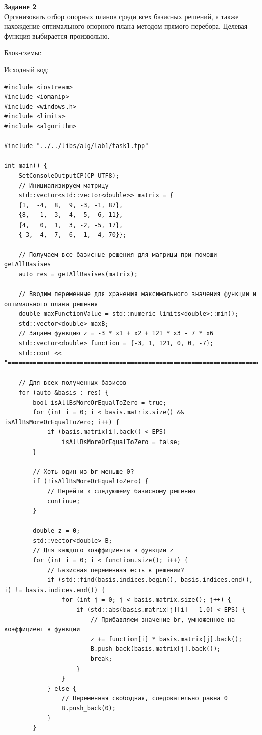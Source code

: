 \documentclass[a4paper,14pt]{extarticle}
\begin{document}
\textbf{Задание 2}\\
Организовать отбор опорных планов среди всех базисных решений, а также нахождение
оптимального опорного плана методом прямого перебора. Целевая функция выбирается
произвольно.\bigbreak

Блок-схемы:
\begin{center}
    
\end{center}
Исходный код:
\begin{verbatim}
#include <iostream>
#include <iomanip>
#include <windows.h>
#include <limits>
#include <algorithm>

#include "../../libs/alg/lab1/task1.tpp"

int main() {
    SetConsoleOutputCP(CP_UTF8);
    // Инициализируем матрицу
    std::vector<std::vector<double>> matrix = {
    {1,  -4,  8,  9, -3, -1, 87},
    {8,   1, -3,  4,  5,  6, 11},
    {4,   0,  1,  3, -2, -5, 17},
    {-3, -4,  7,  6, -1,  4, 70}};

    // Получаем все базисные решения для матрицы при помощи getAllBasises
    auto res = getAllBasises(matrix);

    // Вводим переменные для хранения максимального значения функции и оптимального плана решения 
    double maxFunctionValue = std::numeric_limits<double>::min();
    std::vector<double> maxB;
    // Задаём функцию z = -3 * x1 + x2 + 121 * x3 - 7 * x6
    std::vector<double> function = {-3, 1, 121, 0, 0, -7};
    std::cout << "==================================================================================================================\n";

    // Для всех полученных базисов
    for (auto &basis : res) {
        bool isAllBsMoreOrEqualToZero = true;
        for (int i = 0; i < basis.matrix.size() && isAllBsMoreOrEqualToZero; i++) {
            if (basis.matrix[i].back() < EPS) 
                isAllBsMoreOrEqualToZero = false;
        }

        // Хоть один из br меньше 0?
        if (!isAllBsMoreOrEqualToZero) { 
            // Перейти к следующему базисному решению
            continue;
        }

        double z = 0;
        std::vector<double> B;
        // Для каждого коэффициента в функции z
        for (int i = 0; i < function.size(); i++) {
            // Базисная переменная есть в решении?
            if (std::find(basis.indices.begin(), basis.indices.end(), i) != basis.indices.end()) {
                for (int j = 0; j < basis.matrix.size(); j++) {
                    if (std::abs(basis.matrix[j][i] - 1.0) < EPS) {
                        // Прибавляем значение br, умноженное на коэффициент в функции
                        z += function[i] * basis.matrix[j].back();
                        B.push_back(basis.matrix[j].back());
                        break;
                    }
                }
            } else {
                // Переменная свободная, следовательно равна 0
                B.push_back(0);
            }
        }


\end{verbatim}
\end{document}
